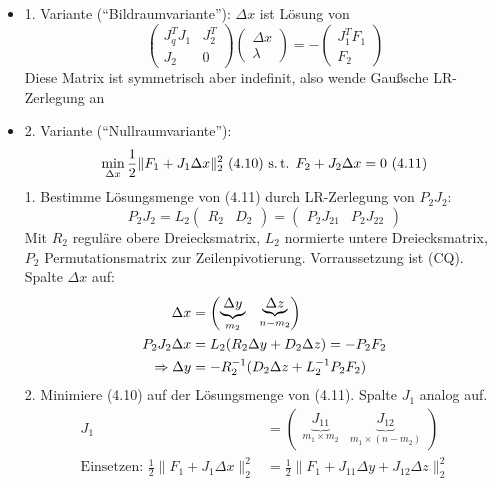 
\begin{itemize}
\item 1. Variante ("`Bildraumvariante"'): $\Delta x$ ist Lösung von 
\[ \begin{pmatrix} J_q^T J_1 & J_2^T \\ J_2 & 0 \end{pmatrix} \begin{pmatrix} \Delta x \\ \lambda \end{pmatrix} = - \begin{pmatrix} J_1^T F_1 \\ F_2 \end{pmatrix} \]
Diese Matrix ist symmetrisch aber indefinit, also wende Gaußsche LR-Zerlegung an
\item 2. Variante ("`Nullraumvariante"'): %
\[ \min_{\Delta x} \frac 12 \| F_1 + J_1 \Delta x\|_2^2 \text{ (4.10) s.\,t. } F_2 + J_2 \Delta x = 0 \text{ (4.11)} \]
1. Bestimme Lösungsmenge von (4.11) durch LR-Zerlegung von $P_2 J_2$:
\[ P_2 J_2 = L_2 \begin{pmatrix} R_2 & D_2 \end{pmatrix} = \begin{pmatrix} P_2 J_{21} & P_2 J_{22} \end{pmatrix} \]
Mit $R_2$ reguläre obere Dreiecksmatrix, $L_2$ normierte untere Dreiecksmatrix, $P_2$ Permutationsmatrix zur Zeilenpivotierung. Vorraussetzung ist (CQ). Spalte $\Delta x$ auf: 
\begin{align*}
\Delta x &= \begin{pmatrix}\underbrace{ \Delta y}_{m_2} & \underbrace{\Delta z}_{n-m_2} \end{pmatrix} \\
P_2 J_2 \Delta x &= L_2( R_2 \Delta y + D_2 \Delta z) = - P_2 F_2 \\
\Rightarrow \Delta y &= - R_2^{-1} ( D_2 \Delta z + L_2^{-1} P_2 F_2) \\
\end{align*}
2. Minimiere (4.10) auf der Lösungsmenge von (4.11). Spalte $J_1$ analog auf.
\begin{align*}
J_1 &= \begin{pmatrix}\underbrace{ J_{11}}_{m_1 \times m_2} & \underbrace{J_{12}}_{m_1 \times (n-m_2)} \end{pmatrix} \\
\text{Einsetzen: } \frac 12 \| F_1 + J_1 \Delta x \|_2^2 &= \frac 12 \|F_1 + J_{11} \Delta y + J_{12} \Delta z \|_2^2 \\

\end{align*}
\end{itemize}
